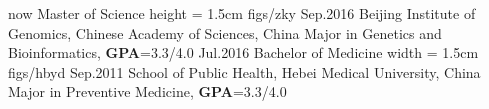 %
%
%
%
%
%
\begin{educations}
	\education
    {now}			{Master of Science}
    {height = 1.5cm}			{figs/zky}
    {Sep.2016}		{Beijing Institute of Genomics, Chinese Academy of Sciences, China}
    {}		{Major in Genetics and Bioinformatics, \textbf{GPA}=3.3/4.0}
  \universitySeparator
  \education
	  {Jul.2016}			{Bachelor of Medicine}
	  {width = 1.5cm}			{figs/hbyd}
	  {Sep.2011}		{School of Public Health, Hebei Medical University, China}
	  {}    {Major in  Preventive Medicine, \textbf{GPA}=3.3/4.0}
\end{educations}
